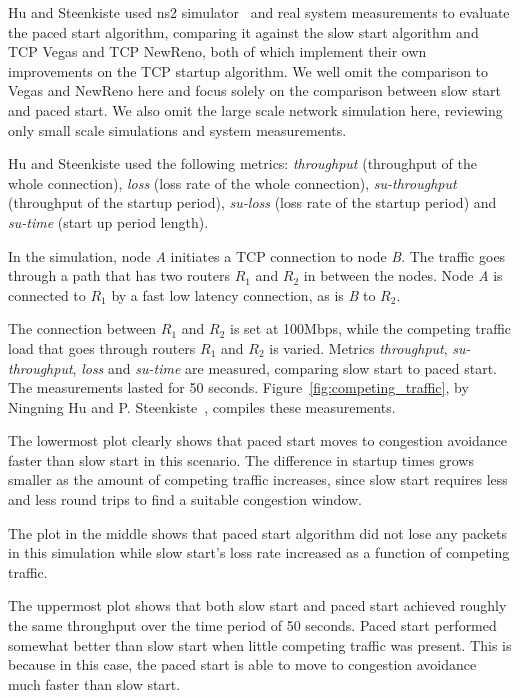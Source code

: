 Hu and Steenkiste used ns2 simulator~\cite{Singh12} and real system measurements to evaluate the paced start algorithm, comparing it against the slow start algorithm and TCP Vegas and TCP NewReno, both of which implement their own improvements on the TCP startup algorithm. We well omit the comparison to Vegas and NewReno here and focus solely on the comparison between slow start and paced start. We also omit the large scale network simulation here, reviewing only small scale simulations and system measurements.

Hu and Steenkiste used the following metrics: \textit{throughput} (throughput of the whole connection),  \textit{loss} (loss rate of the whole connection), \textit{su-throughput} (throughput of the startup period), \textit{su-loss} (loss rate of the startup period) and \textit{su-time} (start up period length).  

In the simulation, node \textit{A} initiates a TCP connection to node \textit{B}. The traffic goes through a path that has two routers \textit{$R_1$} and \textit{$R_2$} in between the nodes. Node \textit{A} is connected to \textit{$R_1$} by a fast low latency connection, as is \textit{B} to \textit{$R_2$}. 

The connection between \textit{$R_1$} and \textit{$R_2$} is set at 100Mbps, while the competing traffic load that goes through routers \textit{$R_1$} and \textit{$R_2$} is varied. Metrics \textit{throughput}, \textit{su-throughput}, \textit{loss} and \textit{su-time} are measured, comparing slow start to paced start. The measurements lasted for 50 seconds. Figure~\ref{fig:competing_traffic}, by Ningning Hu and P. Steenkiste~\cite{Hu03}, compiles these measurements.

The lowermost plot clearly shows that paced start moves to congestion avoidance faster than slow start in this scenario. The difference in startup times grows smaller as the amount of competing traffic increases, since slow start requires less and less round trips to find a suitable congestion window.

The plot in the middle shows that paced start algorithm did not lose any packets in this simulation while slow start's loss rate increased as a function of competing traffic. 

The uppermost plot shows that both slow start and paced start achieved roughly the same throughput over the time period of 50 seconds. Paced start performed somewhat better than slow start when little competing traffic was present. This is because in this case, the paced start is able to move to congestion avoidance much faster than slow start. 

